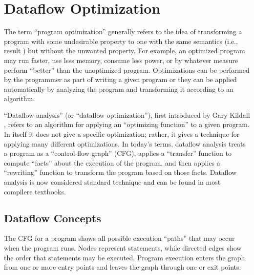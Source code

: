 \documentclass[12pt]{report}
\begin{document}


\renewcommand{\textfraction}{0.1}
\renewcommand{\topfraction}{0.9}

\chapter{Dataflow Optimization}
\label{ref_chapter_background}



The term ``program optimization'' generally refers to the idea of
transforming a program with some undesirable property to one with the
same semantics (i.e., result ) but without the unwanted property.  For
example, an optimized program may run faster, use less memory, consume
less power, or by whatever measure perform ``better'' than the
unoptimized program. Optimizations can be performed by the programmer
as part of writing a given program or they can be applied
automatically by analyzing the program and transforming it according
to an algorithm.

``Dataflow analysis'' (or ``dataflow optimization''), first introduced
by Gary Kildall \citep{Kildall1973}, refers to an algorithm for
applying an ``optimizing function'' to a given program. In itself it
does not give a specific optimization; rather, it gives a technique
for applying many different optimizations. In today's terms, dataflow
analysis treats a program as a ``control-flow graph'' (CFG), applies a
``transfer'' function to compute ``facts'' about the execution of the
program, and then applies a ``rewriting'' function to transform the
program based on those facts. Dataflow analysis is now considered
standard technique and can be found in most compilere textbooks.

\section{Dataflow Concepts}

The CFG for a program shows all possible execution ``paths'' that may
occur when the program runs. Nodes represent statements, while
directed edges show the order that statements may be executed.
Program execution enters the graph from one or more entry points and
leaves the graph through one or exit points.
\end{document}
